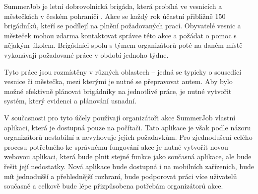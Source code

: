 \begin{introduction}
SummerJob je letní dobrovolnická brigáda, která probíhá
ve vesnicích a městečkách v českém pohraničí \cite{summerjob}. Akce se každý rok účastní přibližně 150 brigádníků, kteří se podílejí na plnění požadovaných prací.
Obyvatelé vesnic a městeček mohou zdarma kontaktovat správce této akce a požádat o pomoc s nějakým úkolem.
Brigádníci spolu s týmem organizátorů poté na daném místě vykonávají požadované práce v období jednoho týdne.

Tyto práce jsou rozmístěny v různých oblastech -- jedná se typicky o sousedící vesnice či městečka, mezi kterými je nutné se přepravovat autem.
Aby bylo možné efektivně plánovat brigádníky na jednotlivé práce, je nutné vytvořit systém, který evidenci a plánování usnadní.

V současnosti pro tyto účely používají organizátoři akce SummerJob vlastní aplikaci, která je dostupná pouze na počítači. Tato aplikace je však podle
názoru organizátorů nestabilní a nevyhovuje jejich požadavkům. Pro zjednodušení celého procesu potřebného ke správnému fungování akce je nutné vytvořit novou webovou aplikaci,
která bude plnit stejné funkce jako
současná aplikace, ale bude řešit její nedostatky. Nová aplikace bude dostupná i na mobilních zařízeních, bude mít jednodušší a přehlednější rozhraní, bude
podporovat práci více uživatelů současně a celkově bude lépe přizpůsobena potřebám organizátorů akce.
\end{introduction}